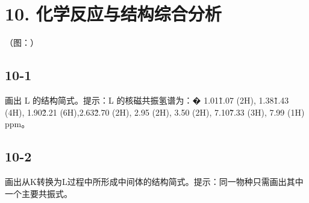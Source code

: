 \section*{10. 化学反应与结构综合分析}
（图：）

\subsection*{10-1}
画出 L 的结构简式。提⽰：L 的核磁共振氢谱为：� 1.01\~1.07 (2H), 1.38\~1.43 (4H), 1.90\~2.21 (6H),2.63\~2.70 (2H), 2.95 (2H), 3.50 (2H), 7.10\~7.33 (3H), 7.99 (1H) ppm。

\subsection*{10-2}
画出从K转换为L过程中所形成中间体的结构简式。提⽰：同⼀物种只需画出其中⼀个主要共振式。
